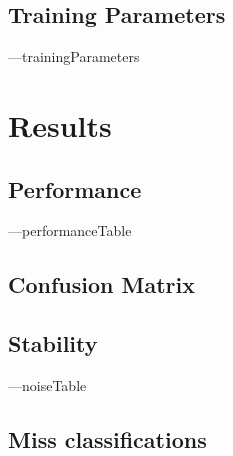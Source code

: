 \documentclass[12pt]{article}
\begin{document}
\subsection{Training Parameters}
\begin{table}[H]
    \centering
    ---trainingParameters
    \end{table}


\section{Results}
\subsection{Performance}
\begin{table}[H]
    \centering
        ---performanceTable
\end{table}
\subsection{Confusion Matrix}
\begin{figure}[H]
    \centering
\end{figure}
\subsection{Stability}
\begin{table}[H]
    \centering
    ---noiseTable
\end{table}  


\subsection{Miss classifications}
\begin{figure}[H]
    \centering
\end{figure}
\end{document}
